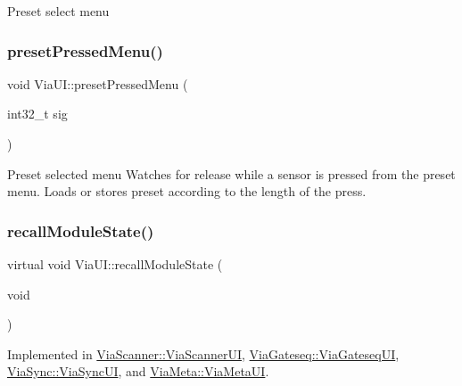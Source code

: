 Preset select menu \mbox{\label{class_via_u_i_a3f67bd0f296939ab1be2bdef56858fd6}} 
\subsubsection{\texorpdfstring{preset\+Pressed\+Menu()}{presetPressedMenu()}}
{\footnotesize\ttfamily void Via\+U\+I\+::preset\+Pressed\+Menu (\begin{DoxyParamCaption}\item[{int32\+\_\+t}]{sig }\end{DoxyParamCaption})}

Preset selected menu Watches for release while a sensor is pressed from the preset menu. Loads or stores preset according to the length of the press. \mbox{\label{class_via_u_i_ac5b88708650fe41ea955c77de580f6f5}} 
\subsubsection{\texorpdfstring{recall\+Module\+State()}{recallModuleState()}}
{\footnotesize\ttfamily virtual void Via\+U\+I\+::recall\+Module\+State (\begin{DoxyParamCaption}\item[{void}]{ }\end{DoxyParamCaption})\hspace{0.3cm}{\ttfamily [pure virtual]}}



Implemented in \mbox{\hyperlink{class_via_scanner_1_1_via_scanner_u_i_a9513c8ecc955ccfbdaebea4172deb210}{Via\+Scanner\+::\+Via\+Scanner\+UI}}, \mbox{\hyperlink{class_via_gateseq_1_1_via_gateseq_u_i_a4f3313685b65a93e1cd12e458dba34de}{Via\+Gateseq\+::\+Via\+Gateseq\+UI}}, \mbox{\hyperlink{class_via_sync_1_1_via_sync_u_i_a1a59cd903a2e11b698445b02c9fe5a48}{Via\+Sync\+::\+Via\+Sync\+UI}}, and \mbox{\hyperlink{class_via_meta_1_1_via_meta_u_i_a40b2c4c2139c78f273d923fdb0d3f4ce}{Via\+Meta\+::\+Via\+Meta\+UI}}.

\mbox{\label{class_via_u_i_ac7abd4e9e7fa598dedab8b4c2486d010}} 
